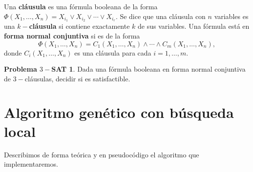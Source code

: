 \documentclass{article}
\theoremstyle{definition}
\newtheorem*{probtSAT}{Problema $3-$\textbf{SAT}}
\newcommand{\PhiXn}{\Phi(X_1,\ldots,X_n)}
\begin{document}
Una \textbf{cláusula} es una fórmula booleana de la forma $\PhiXn=X_{i_1}\lor X_{i_2}\lor\cdots\lor X_{i_r}$. Se dice que una cláusula con $n$ variables es una $k-$\textbf{cláusula} si contiene exactamente $k$ de sus variables. Una fórmula está en \textbf{forma normal conjuntiva} si es de la forma
\[\PhiXn = C_1(X_1,\ldots,X_n)\land\cdots\land C_m(X_1,\ldots,X_n),\]
donde $C_i(X_1,\ldots,X_n)$ es una cláusula para cada $i=1,\ldots,m$.

\begin{probtSAT} Dada una fórmula booleana en forma normal conjuntiva de $3-$cláusulas, decidir si es satisfactible.
\end{probtSAT}
\section{Algoritmo genético con búsqueda local}\label{sec2}
Describimos de forma teórica y en pseudocódigo el algoritmo que implementaremos.
\end{document}

